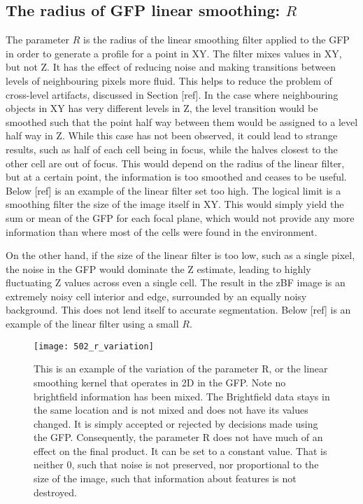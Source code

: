 \subsection{The radius of GFP linear smoothing: $R$}

The parameter $R$ is the radius of the linear smoothing filter applied to the GFP in order to generate a profile for a point in XY. The filter mixes values in XY, but not Z. It has the effect of reducing noise and making transitions between levels of neighbouring pixels more fluid. This helps to reduce the problem of cross-level artifacts, discussed in Section [ref]. In the case where neighbouring objects in XY has very different levels in Z, the level transition would be smoothed such that the point half way between them would be assigned to a level half way in Z. While this case has not been observed, it could lead to strange results, such as half of each cell being in focus, while the halves closest to the other cell are out of focus. This would depend on the radius of the linear filter, but at a certain point, the information is too smoothed and ceases to be useful. Below [ref] is an example of the linear filter set too high. The logical limit is a smoothing filter the size of the image itself in XY. This would simply yield the sum or mean of the GFP for each focal plane, which would not provide any more information than where most of the cells were found in the environment.

On the other hand, if the size of the linear filter is too low, such as a single pixel, the noise in the GFP would dominate the Z estimate, leading to highly fluctuating Z values across even a single cell. The result in the zBF image is an extremely noisy cell interior and edge, surrounded by an equally noisy background. This does not lend itself to accurate segmentation. Below [ref] is an example of the linear filter using a small $R$.

\begin{figure}[h!]
 \centering
 \texttt{[image: 502\_r\_variation]}
 \caption[Varying R]{
 	This is an example of the variation of the parameter R, or the linear smoothing kernel that operates in 2D in the GFP. Note no brightfield information has been mixed. The Brightfield data stays in the same location and is not mixed and does not have its values changed. It is simply accepted or rejected by decisions made using the GFP. Consequently, the parameter R does not have much of an effect on the final product. It can be set to a constant value. That is neither 0, such that noise is not preserved, nor proportional to the size of the image, such that information about features is not destroyed.
 }
 \label{fig:rvariation}
\end{figure}


